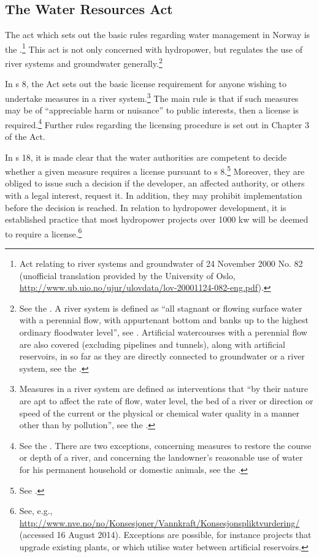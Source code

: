 \subsection{The Water Resources Act}\label{sec:wra00}

The act which sets out the basic rules regarding water management in Norway is the \cite{wra00}.\footnote{Act relating to river systems and groundwater of 24 November 2000 No. 82 (unofficial translation provided by the University of Oslo, \url{http://www.ub.uio.no/ujur/ulovdata/lov-20001124-082-eng.pdf}).} This act is not only concerned with hydropower, but regulates the use of river systems and groundwater generally.\footnote{See the \cite[1]{wra00}. A river system is defined as ``all stagnant or flowing surface water with a perennial flow, with appurtenant bottom and banks up to the highest ordinary floodwater level'', see \cite[2]{wra00}. Artificial watercourses with a perennial flow are also covered (excluding pipelines and tunnels), along with artificial reservoirs, in so far as they are directly connected to groundwater or a river system, see the \cite[2a-2b]{wra00}.} 

In s 8, the Act sets out the basic license requirement for anyone wishing to undertake measures in a river system.\footnote{Measures in a river system are defined as interventions that ``by their nature are apt to affect the rate of flow, water level, the bed of a river or direction or speed of the current or the physical or chemical water quality in a manner other than by pollution'', see the \cite[3a]{wra00}.} The main rule is that if such measures may be of ``appreciable harm or nuisance''  to public interests, then a license is required.\footnote{See the \cite[8]{wra00}. There are two exceptions, concerning measures to restore the course or depth of a river, and concerning the landowner's reasonable use of water for his permanent household or domestic animals, see the \cite[12|15]{wra00}.} Further rules regarding the licensing procedure is set out in Chapter 3 of the Act.

In s 18, it is made clear that the water authorities are competent to decide whether a given measure requires a license pursuant to s 8.\footnote{See \cite[18]{wra00}.}  Moreover, they are obliged to issue such a decision if the developer, an affected authority, or others with a legal interest, request it. In addition, they may prohibit implementation before the decision is reached. In relation to hydropower development, it is established practice that most hydropower projects over 1000 kw will be deemed to require a license.\footnote{See, e.g., \url{http://www.nve.no/no/Konsesjoner/Vannkraft/Konsesjonspliktvurdering/} (accessed 16 August 2014). Exceptions are possible, for instance projects that upgrade existing plants, or which utilise water between artificial reservoirs.}

